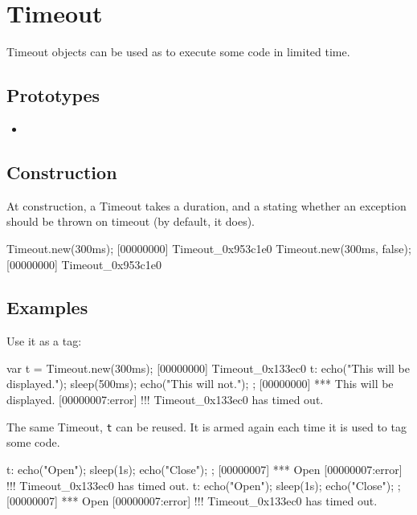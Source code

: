 \section{Timeout}

Timeout objects can be used as  to execute some
code in limited time.

\subsection{Prototypes}
\begin{itemize}
\item {}
\end{itemize}

\subsection{Construction}
At construction, a Timeout takes a duration, and a 
stating whether an exception should be thrown on timeout (by default,
it does).

\begin{urbiscript}
Timeout.new(300ms);
[00000000] Timeout_0x953c1e0
Timeout.new(300ms, false);
[00000000] Timeout_0x953c1e0
\end{urbiscript}

\subsection{Examples}

Use it as a tag:

\begin{urbiscript}
var t = Timeout.new(300ms);
[00000000] Timeout_0x133ec0
t:{
  echo("This will be displayed.");
  sleep(500ms);
  echo("This will not.");
};
[00000000] *** This will be displayed.
[00000007:error] !!! Timeout_0x133ec0 has timed out.
\end{urbiscript}

The same Timeout, \lstinline|t| can be reused.  It is armed again each
time it is used to tag some code.

\begin{urbiscript}
t: { echo("Open"); sleep(1s); echo("Close"); };
[00000007] *** Open
[00000007:error] !!! Timeout_0x133ec0 has timed out.
t: { echo("Open"); sleep(1s); echo("Close"); };
[00000007] *** Open
[00000007:error] !!! Timeout_0x133ec0 has timed out.
\end{urbiscript}

